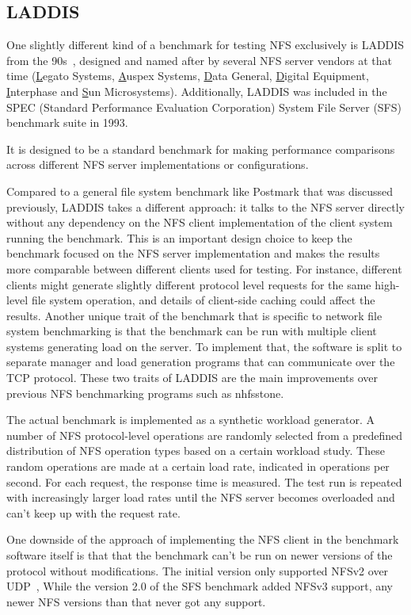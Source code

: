 \subsection{LADDIS}
One slightly different kind of a benchmark for testing NFS exclusively is LADDIS from the 90s~\cite{LADDIS}, designed and named after by
several NFS server vendors at that time (\underline{L}egato Systems, \underline{A}uspex Systems, \underline{D}ata General,
\underline{D}igital Equipment, \underline{I}nterphase and \underline{S}un Microsystems).
Additionally, LADDIS was included in the SPEC (Standard Performance Evaluation Corporation) System File Server (SFS) benchmark suite in 1993.

It is designed to be a standard benchmark for making performance comparisons across different NFS server implementations or configurations.

Compared to a general file system benchmark like Postmark that was discussed previously,
LADDIS takes a different approach: it talks to the NFS server directly
without any dependency on the NFS client implementation of the client system running the benchmark.
This is an important design choice to keep the benchmark focused on the NFS server implementation and makes the results more comparable
between different clients used for testing.
For instance, different clients might generate slightly different protocol level requests for the same high-level file system operation,
and details of client-side caching could affect the results.
Another unique trait of the benchmark that is specific to network file system benchmarking is that the benchmark can be run with
multiple client systems generating load on the server.
To implement that, the software is split to separate manager and load generation programs that can communicate over the TCP protocol.
These two traits of LADDIS are the main improvements over previous NFS benchmarking programs such as nhfsstone.

The actual benchmark is implemented as a synthetic workload generator.
A number of NFS protocol-level operations are randomly selected from a predefined distribution of NFS operation types
based on a certain workload study.
These random operations are made at a certain load rate, indicated in operations per second.
For each request, the response time is measured.
The test run is repeated with increasingly larger load rates until the NFS server becomes overloaded and can't keep up with the request rate.

One downside of the approach of implementing the NFS client in the benchmark software itself is that
that the benchmark can't be run on newer versions of the protocol without modifications.
The initial version only supported NFSv2 over UDP~\cite{MetaStudy},
While the version 2.0 of the SFS benchmark added NFSv3 support, any newer NFS versions than that never got any support.

